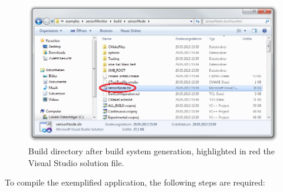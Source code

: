 \begin{enumerate}
\begin{figure}[htpb]
	\centering
	\includegraphics[width=\textwidth]{figures/build_directory_edited.png}
	\caption{Build directory after build system generation, highlighted in red the Visual Studio solution file.}
	\label{fig:build_directory}
\end{figure}

\end{enumerate}

\noindent To compile the exemplified application, the following steps are required:

